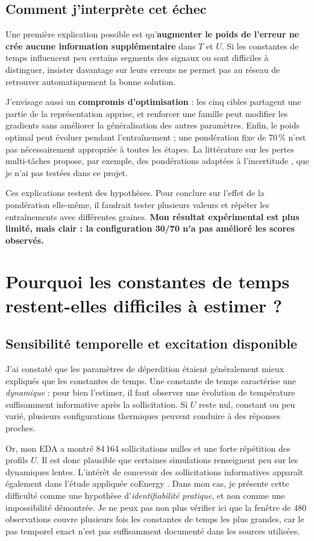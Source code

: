 \documentclass[10pt,a4paper]{article}
\begin{document}
\subsection{Comment j'interprète cet échec}
Une première explication possible est qu'\textbf{augmenter le poids de l'erreur ne crée aucune information supplémentaire} dans $T$ et $U$. Si les constantes de temps influencent peu certains segments des signaux ou sont difficiles à distinguer, insister davantage sur leurs erreurs ne permet pas au réseau de retrouver automatiquement la bonne solution.

J'envisage aussi un \textbf{compromis d'optimisation} : les cinq cibles partagent une partie de la représentation apprise, et renforcer une famille peut modifier les gradients sans améliorer la généralisation des autres paramètres. Enfin, le poids optimal peut évoluer pendant l'entraînement ; une pondération fixe de 70\,\% n'est pas nécessairement appropriée à toutes les étapes. La littérature sur les pertes multi-tâches propose, par exemple, des pondérations adaptées à l'incertitude \cite{kendall2018}, que je n'ai pas testées dans ce projet.

Ces explications restent des hypothèses. Pour conclure sur l'effet de la pondération elle-même, il faudrait tester plusieurs valeurs et répéter les entraînements avec différentes graines. \textbf{Mon résultat expérimental est plus limité, mais clair : la configuration 30/70 n'a pas amélioré les scores observés.}

\section{Pourquoi les constantes de temps restent-elles difficiles à estimer ?}

\subsection{Sensibilité temporelle et excitation disponible}
J'ai constaté que les paramètres de déperdition étaient généralement mieux expliqués que les constantes de temps. Une constante de temps caractérise une \emph{dynamique} : pour bien l'estimer, il faut observer une évolution de température suffisamment informative après la sollicitation. Si $U$ reste nul, constant ou peu varié, plusieurs configurations thermiques peuvent conduire à des réponses proches.

Or, mon EDA a montré 84\,164 sollicitations nulles et une forte répétition des profils $U$. Il est donc plausible que certaines simulations renseignent peu sur les dynamiques lentes. L'intérêt de concevoir des sollicitations informatives apparaît également dans l'étude appliquée coEnergy \cite{coenergy2026}. Dans mon cas, je présente cette difficulté comme une hypothèse d'\emph{identifiabilité pratique}, et non comme une impossibilité démontrée. Je ne peux pas non plus vérifier ici que la fenêtre de 480 observations couvre plusieurs fois les constantes de temps les plus grandes, car le pas temporel exact n'est pas suffisamment documenté dans les sources utilisées.
\end{document}

